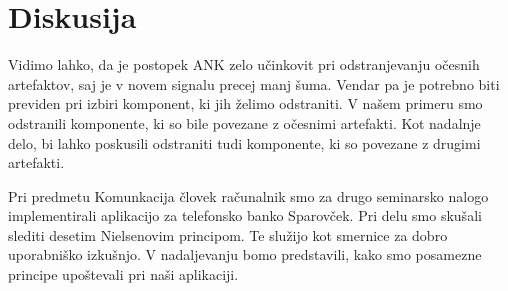 \documentclass{article}
\begin{document}
\section{Diskusija}
\label{sec:discussion}

Vidimo lahko, da je postopek ANK zelo učinkovit pri odstranjevanju očesnih artefaktov, saj je v novem signalu precej manj šuma. Vendar pa je potrebno biti previden pri izbiri komponent, ki jih želimo odstraniti. V našem primeru smo odstranili komponente, ki so bile povezane z očesnimi artefakti. Kot nadalnje delo, bi lahko poskusili odstraniti tudi komponente, ki so povezane z drugimi artefakti.



Pri predmetu Komunkacija človek računalnik smo za drugo seminarsko nalogo implementirali aplikacijo za telefonsko banko Sparovček. Pri delu smo skušali slediti desetim Nielsenovim principom. Te služijo kot smernice za dobro uporabniško izkušnjo. V nadaljevanju bomo predstavili, kako smo posamezne principe upoštevali pri naši aplikaciji.
\end{document}
